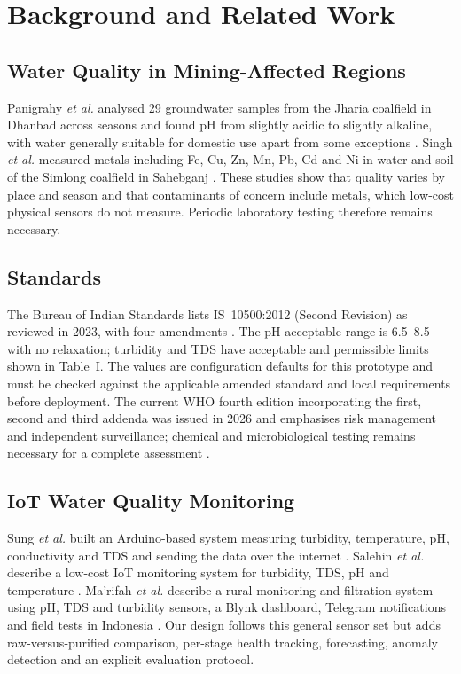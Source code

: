 \documentclass[10pt,letterpaper,twocolumn]{article}
\begin{document}
\section{Background and Related Work}
\subsection{Water Quality in Mining-Affected Regions}
Panigrahy \emph{et al.} analysed 29 groundwater samples from the Jharia coalfield in Dhanbad across seasons and found pH from slightly acidic to slightly alkaline, with water generally suitable for domestic use apart from some exceptions \cite{panigrahy2015}. Singh \emph{et al.} measured metals including Fe, Cu, Zn, Mn, Pb, Cd and Ni in water and soil of the Simlong coalfield in Sahebganj \cite{singh2015}. These studies show that quality varies by place and season and that contaminants of concern include metals, which low-cost physical sensors do not measure. Periodic laboratory testing therefore remains necessary.

\subsection{Standards}
The Bureau of Indian Standards lists IS~10500:2012 (Second Revision) as reviewed in 2023, with four amendments \cite{bis}. The pH acceptable range is 6.5--8.5 with no relaxation; turbidity and TDS have acceptable and permissible limits shown in Table~I. The values are configuration defaults for this prototype and must be checked against the applicable amended standard and local requirements before deployment. The current WHO fourth edition incorporating the first, second and third addenda was issued in 2026 and emphasises risk management and independent surveillance; chemical and microbiological testing remains necessary for a complete assessment \cite{who}.

\subsection{IoT Water Quality Monitoring}
Sung \emph{et al.} built an Arduino-based system measuring turbidity, temperature, pH, conductivity and TDS and sending the data over the internet \cite{sung2021}. Salehin \emph{et al.} describe a low-cost IoT monitoring system for turbidity, TDS, pH and temperature \cite{salehin2023}. Ma'rifah \emph{et al.} describe a rural monitoring and filtration system using pH, TDS and turbidity sensors, a Blynk dashboard, Telegram notifications and field tests in Indonesia \cite{marifah2025}. Our design follows this general sensor set but adds raw-versus-purified comparison, per-stage health tracking, forecasting, anomaly detection and an explicit evaluation protocol.
\end{document}
